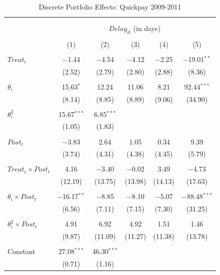 \documentclass[
]{article}
\begin{document}
\begin{table}[H] \centering 
  \caption{Discrete Portfolio Effects: Quickpay 2009-2011} 
  \label{} 
\small 
\begin{tabular}{@{\extracolsep{-2pt}}lccccc} 
\\[-1.8ex]\hline 
\hline \\[-1.8ex] 
\\[-1.8ex] & \multicolumn{5}{c}{$Delay_{it}$ (in days)} \\ 
\\[-1.8ex] & (1) & (2) & (3) & (4) & (5)\\ 
\hline \\[-1.8ex] 
 $Treat_i$ & $-$1.44 & $-$4.54 & $-$4.12 & $-$2.25 & $-$19.01$^{**}$ \\ 
  & (2.52) & (2.79) & (2.80) & (2.88) & (8.36) \\ 
  & & & & & \\ 
 $\theta_i$ & 15.63$^{*}$ & 12.24 & 11.06 & 8.21 & 92.44$^{***}$ \\ 
  & (8.14) & (8.85) & (8.89) & (9.06) & (34.90) \\ 
  & & & & & \\ 
 $\theta_i^2$ & 15.67$^{***}$ & 6.85$^{***}$ &  &  &  \\ 
  & (1.05) & (1.83) &  &  &  \\ 
  & & & & & \\ 
 $Post_t$ & $-$3.83 & 2.64 & 1.05 & 0.34 & 9.39 \\ 
  & (3.74) & (4.31) & (4.38) & (4.45) & (5.79) \\ 
  & & & & & \\ 
 $Treat_i \times Post_t$ & 4.16 & $-$3.40 & $-$0.02 & 3.49 & $-$4.73 \\ 
  & (12.19) & (13.75) & (13.98) & (14.13) & (17.63) \\ 
  & & & & & \\ 
 $\theta_i \times Post_t$ & $-$16.17$^{**}$ & $-$8.85 & $-$8.10 & $-$5.07 & $-$88.48$^{***}$ \\ 
  & (6.56) & (7.11) & (7.15) & (7.30) & (31.25) \\ 
  & & & & & \\ 
 $\theta_i^2 \times Post_t$ & 4.91 & 6.92 & 4.92 & 1.51 & 1.46 \\ 
  & (9.87) & (11.09) & (11.27) & (11.38) & (13.78) \\ 
  & & & & & \\ 
 Constant & 27.08$^{***}$ & 46.30$^{***}$ &  &  &  \\ 
  & (0.71) & (1.16) &  &  &  \\ 

\end{tabular}
\end{table}
\end{document}
